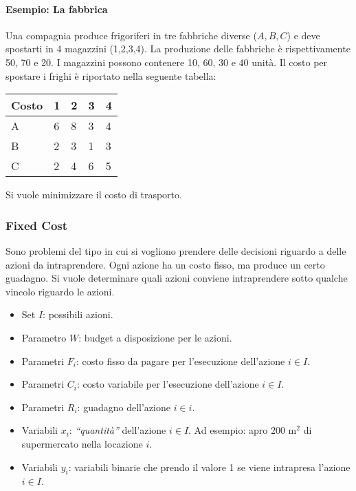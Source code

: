 \paragraph{Esempio: La fabbrica}

Una compagnia produce frigoriferi in tre fabbriche diverse ($A, B, C$) e deve spostarti in 4 magazzini (1,2,3,4). La produzione delle fabbriche è rispettivamente 50, 70 e 20. I magazzini possono contenere 10, 60, 30 e 40 unità. Il costo per spostare i frighi è riportato nella seguente tabella:

\begin{table}[htbp]
	\centering
	\begin{tabular}{|l|l|l|l|l|}
		\hline
		Costo & 1 & 2 & 3 & 4 \\ \hline
		A    & 6 & 8 & 3 & 4\\ \hline
		B    &2 & 3 & 1 &3\\ \hline
		C    & 2 & 4 & 6 &5\\ \hline
	\end{tabular}
\end{table}

Si vuole minimizzare il costo di trasporto.

\subsubsection{Fixed Cost}

Sono problemi del tipo in cui si vogliono prendere delle decisioni riguardo a delle azioni da intraprendere.
Ogni azione ha un costo fisso, ma produce un certo guadagno.
Si vuole determinare quali azioni conviene intraprendere sotto qualche vincolo riguardo le azioni.

\begin{itemize}
	\item Set $I$: possibili azioni.
	\item Parametro $W$: budget a disposizione per le azioni.
	\item Parametri $F_i$: costo fisso da pagare per l'esecuzione dell'azione $i \in I$.
	\item Parametri $C_i$: costo variabile per l'esecuzione dell'azione $i \in I$.
	\item Parametri $R_i$: guadagno dell'azione $i \in i$.
	\item Variabili $x_i$: \textit{``quantità''} dell'azione $i \in I$. Ad esempio: apro 200 $\text{m}^2$ di supermercato nella locazione $i$.
	\item Variabili $y_i$: variabili binarie che prendo il valore 1 se viene intrapresa l'azione $i \in I$.
\end{itemize}


